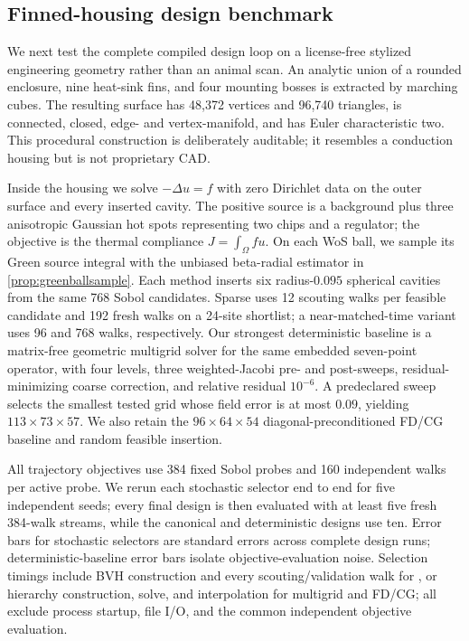 \subsection{Finned-housing design benchmark}

We next test the complete compiled design loop on a license-free stylized
engineering geometry rather than an animal scan.  An analytic union of a
rounded enclosure, nine heat-sink fins, and four mounting bosses is extracted
by marching cubes.  The resulting surface has 48,372 vertices and 96,740
triangles, is connected, closed, edge- and vertex-manifold, and has Euler
characteristic two.  This procedural construction is deliberately auditable;
it resembles a conduction housing but is not proprietary CAD.

Inside the housing we solve $-\Delta u=f$ with zero Dirichlet data on the outer
surface and every inserted cavity.  The positive source is a background plus
three anisotropic Gaussian hot spots representing two chips and a regulator;
the objective is the thermal compliance $J=\int_\Omega fu$.  On each WoS ball,
we sample its Green source integral with the unbiased beta-radial estimator in
\cref{prop:greenballsample}.  Each method inserts six radius-$0.095$ spherical
cavities from the same 768 Sobol candidates.  Sparse \method{} uses 12 scouting
walks per feasible candidate and 192 fresh walks on a 24-site shortlist; a
near-matched-time variant uses 96 and 768 walks, respectively.  Our strongest
deterministic baseline is a matrix-free geometric multigrid solver for the same
embedded seven-point operator, with four levels, three weighted-Jacobi pre- and
post-sweeps, residual-minimizing coarse correction, and relative residual
$10^{-6}$.  A predeclared sweep selects the smallest tested grid whose field
error is at most $0.09$, yielding $113\times73\times57$.  We also retain the
$96\times64\times54$ diagonal-preconditioned FD/CG baseline and random feasible
insertion.

All trajectory objectives use 384 fixed Sobol probes and 160 independent
walks per active probe.  We rerun each stochastic selector end to end for five
independent seeds; every final design is then evaluated with at least five fresh
384-walk streams, while the canonical and deterministic designs use ten.
Error bars for stochastic selectors are standard errors across complete design
runs; deterministic-baseline error bars isolate objective-evaluation noise.
Selection timings include BVH construction and every scouting/validation walk
for \method{}, or hierarchy construction, solve, and interpolation for
multigrid and FD/CG; all exclude process startup, file I/O, and the common
independent objective evaluation.



